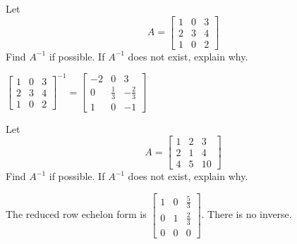 \documentclass{ximera}
\begin{document}
\begin{problem}\label{prb:4.41}Let
\begin{equation*}
A=\left[
\begin{array}{rrr}
1 & 0 & 3 \\
2 & 3 & 4 \\
1 & 0 & 2
\end{array}
\right]
\end{equation*}
Find $A^{-1}$ if possible. If $A^{-1}$ does not exist, explain why.
\begin{hint}
$\left[
\begin{array}{ccc}
1 & 0 & 3 \\
2 & 3 & 4 \\
1 & 0 & 2
\end{array}
\right]^{-1}= \left[
\begin{array}{rrr}
-2 & 0 & 3 \\
0 &  \frac{1}{3} & - \frac{2}{3} \\
1 & 0 & -1
\end{array}
\right]$
\end{hint}
\end{problem}

\begin{problem}\label{prb:4.42}Let
\begin{equation*}
A=\left[
\begin{array}{rrr}
1 & 2 & 3 \\
2 & 1 & 4 \\
4 & 5 & 10
\end{array}
\right]
\end{equation*}
Find $A^{-1}$ if possible. If $A^{-1}$ does not exist, explain why.
\begin{hint}
The reduced row echelon form is
$\left[
\begin{array}{ccc}
1 & 0 &  \frac{5}{3} \\
0 & 1 &  \frac{2}{3} \\
0 & 0 & 0
\end{array}
\right]$. There is no inverse.
\end{hint}
\end{problem}
\end{document}
